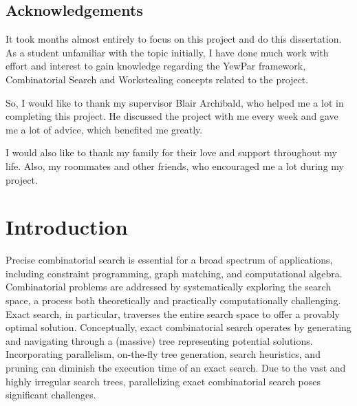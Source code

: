 \documentclass{mproj}
\begin{document}

\educationalconsent



\newpage
\section*{Acknowledgements}

It took months almost entirely to focus on this project and do this dissertation.
As a student unfamiliar with the topic initially,
I have done much work with effort and interest to gain knowledge regarding the YewPar framework,
Combinatorial Search and Workstealing concepts related to the project.

So, I would like to thank my supervisor Blair Archibald, who helped me a lot in completing this project.
He discussed the project with me every week and gave me a lot of advice, which benefited me
greatly.

I would also like to thank my family for their love and support throughout my life. Also, my
roommates and other friends, who encouraged me a lot during my project.

\tableofcontents

\chapter{Introduction}\label{intro}

Precise combinatorial search is essential for a broad spectrum of applications,
including constraint programming, graph matching, and computational algebra.
Combinatorial problems are addressed by systematically exploring the search space,
a process both theoretically and practically computationally challenging.
Exact search, in particular, traverses the entire search space to offer a provably optimal solution.
Conceptually, exact combinatorial search operates by generating and navigating through a (massive) tree representing potential solutions.
Incorporating parallelism, on-the-fly tree generation, search heuristics, and pruning can diminish the execution time of an exact search.
Due to the vast and highly irregular search trees, parallelizing exact combinatorial search poses significant challenges.
\end{document}
